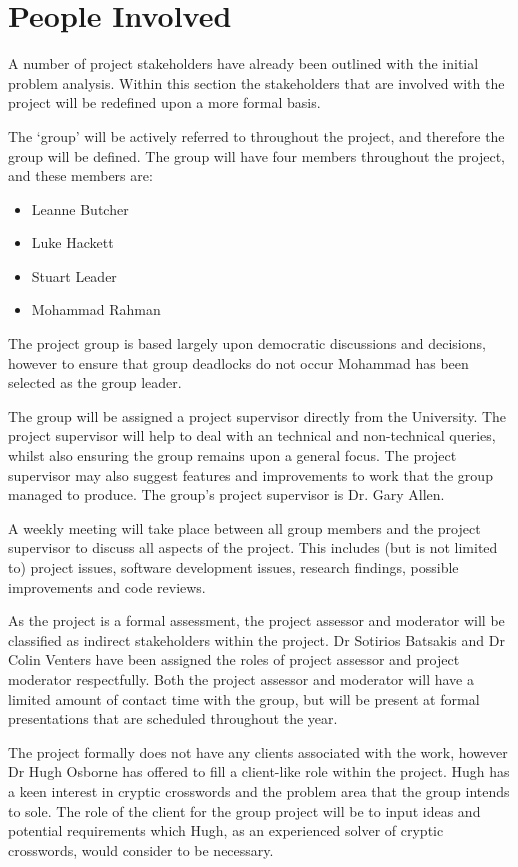 \section{People Involved}
\label{sec:people_involved}

A number of project stakeholders have already been outlined with the initial
problem analysis. Within this section the stakeholders that are involved with
the project will be redefined upon a more formal basis.

The `group' will be actively referred to throughout the project, and therefore 
the group will be defined. The group will have four members throughout the 
project, and these members are:

\begin{itemize}
  \item Leanne Butcher
  \item Luke Hackett
  \item Stuart Leader
  \item Mohammad Rahman
\end{itemize}

The project group is based largely upon democratic discussions and decisions,
however to ensure that group deadlocks do not occur Mohammad has been selected 
as the group leader.

The group will be assigned a project supervisor directly from the University.
The project supervisor will help to deal with an technical and non-technical
queries, whilst also ensuring the group remains upon a general focus. The
project supervisor may also suggest features and improvements to work that the
group managed to produce. The group's project supervisor is Dr. Gary Allen.

A weekly meeting will take place between all group members and the project 
supervisor to discuss all aspects of the project. This includes (but is not 
limited to) project issues, software development issues, research findings, 
possible improvements and code reviews.

As the project is a formal assessment, the project assessor and moderator will 
be classified as indirect stakeholders within the project. Dr Sotirios Batsakis
and Dr Colin Venters have been assigned the roles of project assessor and 
project moderator respectfully. Both the project assessor and moderator will 
have a limited amount of contact time with the group, but will be present at 
formal presentations that are scheduled throughout the year.

The project formally does not have any clients associated with the work, however
Dr Hugh Osborne has offered to fill a client-like role within the project. Hugh
has a keen interest in cryptic crosswords and the problem area that the group
intends to sole. The role of the client for the group project will be to input
ideas and potential requirements which Hugh, as an experienced solver of cryptic
crosswords, would consider to be necessary.
